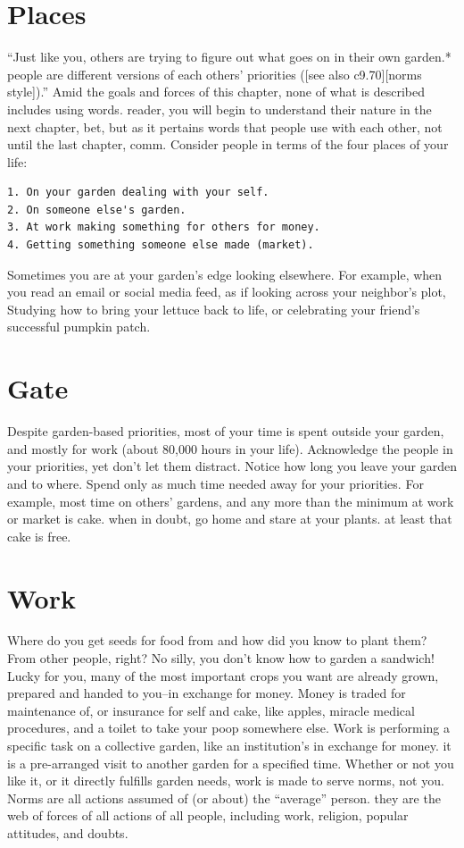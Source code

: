 \documentclass[
]{book}
\begin{document}
\section{Places}\label{places}

``Just like you, others are trying to figure out what goes on in their own garden.* people are different versions of each others' priorities ({[}see also c9.70{]}{[}norms style{]}).''
Amid the goals and forces of this chapter, none of what is described includes using words. reader, you will begin to understand their nature in the next chapter, bet, but as it pertains words that people use with each other, not until the last chapter, comm.
Consider people in terms of the four places of your life:

\begin{verbatim}
1. On your garden dealing with your self.
2. On someone else's garden.
3. At work making something for others for money.
4. Getting something someone else made (market).
\end{verbatim}

Sometimes you are at your garden's edge looking elsewhere.
For example, when you read an email or social media feed, as if looking across your neighbor's plot,
Studying how to bring your lettuce back to life, or celebrating your friend's successful pumpkin patch.

\section{Gate}\label{gate}

Despite garden-based priorities, most of your time is spent outside your garden, and mostly for work (about 80,000 hours in your life).
Acknowledge the people in your priorities, yet don't let them distract.
Notice how long you leave your garden and to where.
Spend only as much time needed away for your priorities.
For example, most time on others' gardens, and any more than the minimum at work or market is cake. when in doubt, go home and stare at your plants. at least that cake is free.

\section{Work}\label{work}

Where do you get seeds for food from and how did you know to plant them?
From other people, right? No silly, you don't know how to garden a sandwich!
Lucky for you, many of the most important crops you want are already grown, prepared and handed to you--in exchange for money.
Money is traded for maintenance of, or insurance for self and cake, like apples, miracle medical procedures, and a toilet to take your poop somewhere else.
Work is performing a specific task on a collective garden, like an institution's in exchange for money. it is a pre-arranged visit to another garden for a specified time.
Whether or not you like it, or it directly fulfills garden needs, work is made to serve norms, not you.
Norms are all actions assumed of (or about) the ``average'' person. they are the web of forces of all actions of all people, including work, religion, popular attitudes, and doubts.
\end{document}
